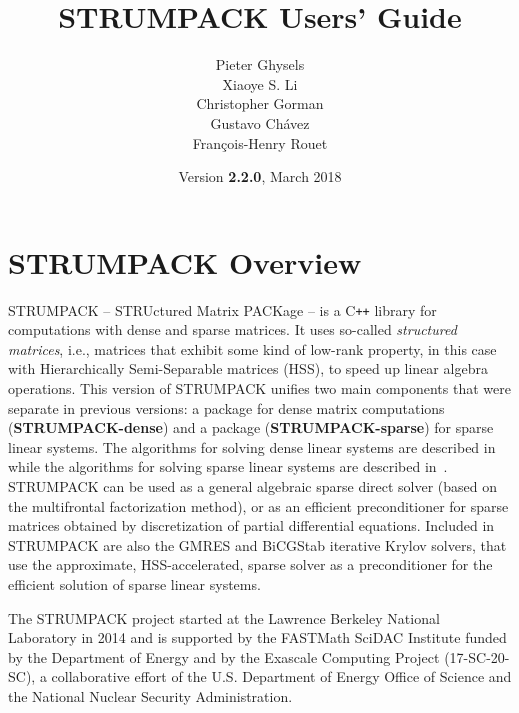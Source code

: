 \documentclass{article}
\title{\textbf{STRUMPACK Users' Guide}}
\author{Pieter Ghysels\footnotemark[1] \\
  Xiaoye S. Li\footnotemark[1] \\
  Christopher Gorman\footnotemark[2] \\
  Gustavo Ch\'{a}vez\footnotemark[1] \\
  Fran\c{c}ois-Henry Rouet\footnotemark[3]}
\date{Version \textbf{2.2.0}, March 2018}
\begin{document}
\maketitle

\vfill


\pagebreak

\tableofcontents

\pagebreak
\section{STRUMPACK Overview}
STRUMPACK -- STRUctured Matrix PACKage -- is a C\texttt{++} library
for computations with dense and sparse matrices. It uses so-called
\emph{structured matrices}, i.e., matrices that exhibit some kind of
low-rank property, in this case with Hierarchically Semi-Separable
matrices (HSS), to speed up linear algebra operations.  This version
of STRUMPACK unifies two main components that were separate in
previous versions: a package for dense matrix computations
(\textbf{STRUMPACK-dense}) and a package (\textbf{STRUMPACK-sparse})
for sparse linear systems. The algorithms for solving dense linear
systems are described in~\cite{rouet2014distributed} while the
algorithms for solving sparse linear systems are described
in~\cite{ghysels2015sparse,ghysels2017sparse}. STRUMPACK can be used
as a general algebraic sparse direct solver (based on the multifrontal
factorization method), or as an efficient preconditioner for sparse
matrices obtained by discretization of partial differential
equations. Included in STRUMPACK are also the GMRES and BiCGStab
iterative Krylov solvers, that use the approximate, HSS-accelerated,
sparse solver as a preconditioner for the efficient solution of sparse
linear systems.

The STRUMPACK project started at the Lawrence Berkeley National
Laboratory in 2014 and is supported by the FASTMath SciDAC Institute
funded by the Department of Energy and by the Exascale Computing
Project (17-SC-20-SC), a collaborative effort of the U.S. Department
of Energy Office of Science and the National Nuclear Security
Administration.
\end{document}
